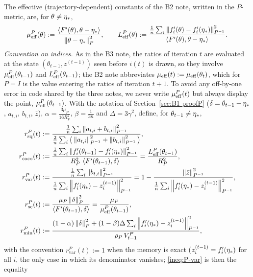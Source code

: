 \begin{definition}\label{def:B1-ratios}
The effective (trajectory-dependent) constants of the B2 note, written in the $P$-metric, are, for
$\theta\neq\eta_\ast$,
\begin{equation}\label{eq:B1-eff-constants}
\mu_{\mathrm{eff}}^P(\theta):=\frac{\left\langle F'(\theta), \theta-\eta_\ast \right\rangle}{\left\|\theta-\eta_\ast\right\|_P^2},
\qquad
L_{\mathrm{eff}}^P(\theta):=\frac{\frac1n\sum_i\left\|f'_i(\theta)-f'_i(\eta_\ast)\right\|_{P^{-1}}^2}
{\left\langle F'(\theta), \theta-\eta_\ast \right\rangle} .
\end{equation}
\emph{Convention on indices.} As in the B3 note, the ratios of iteration $t$ are evaluated at the state
$(\theta_{t-1},z^{(t-1)})$ seen before $i(t)$ is drawn, so they involve $\mu_{\mathrm{eff}}^P(\theta_{t-1})$ and
$L_{\mathrm{eff}}^P(\theta_{t-1})$; the B2 note abbreviates $\mu_{\mathrm{eff}}(t):=\mu_{\mathrm{eff}}(\theta_t)$, which for $P=I$ is the
value entering the ratios of iteration $t+1$. To avoid any off-by-one error in code shared by the three
notes, we never write $\mu_{\mathrm{eff}}^P(t)$ but always display the point, $\mu_{\mathrm{eff}}^P(\theta_{t-1})$.
With the notation of Section~\ref{sec:B1-proofP} ($\delta=\theta_{t-1}-\eta_\ast$, $a_{t,i}$, $b_{t,i}$,
$\bar z$), $\alpha=\frac{3\mu_P}{16R_P^2}$, $\beta=\frac1{3n}$ and $\Delta=3\gamma^2$, define, for
$\theta_{t-1}\neq\eta_\ast$,
\begin{align*}
r^P_{\mathrm{sq}}(t)&:=\frac{\frac1n\sum_i\left\|a_{t,i}+b_{t,i}\right\|_{P^{-1}}^2}
{\frac2n\sum_i\big(\left\|a_{t,i}\right\|_{P^{-1}}^2+\left\|b_{t,i}\right\|_{P^{-1}}^2\big)},\\
r^P_{\mathrm{coco}}(t)&:=\frac{\frac1n\sum_i\left\|f'_i(\theta_{t-1})-f'_i(\eta_\ast)\right\|_{P^{-1}}^2}
{R_P^2\,\left\langle F'(\theta_{t-1}), \delta \right\rangle}=\frac{L_{\mathrm{eff}}^P(\theta_{t-1})}{R_P^2},\\
r^P_{\mathrm{var}}(t)&:=\frac{\frac1n\sum_i\left\|b_{t,i}\right\|_{P^{-1}}^2}
{\frac1n\sum_i\left\|f'_i(\eta_\ast)-z_i^{(t-1)}\right\|_{P^{-1}}^2}
=1-\frac{\left\|\bar z\right\|_{P^{-1}}^2}{\frac1n\sum_i\left\|f'_i(\eta_\ast)-z_i^{(t-1)}\right\|_{P^{-1}}^2},\\
r^P_{\mathrm{sc}}(t)&:=\frac{\mu_P\left\|\delta\right\|_P^2}{\left\langle F'(\theta_{t-1}), \delta \right\rangle}
=\frac{\mu_P}{\mu_{\mathrm{eff}}^P(\theta_{t-1})},\\
r^P_{\mathrm{min}}(t)&:=\frac{(1-\alpha)\left\|\delta\right\|_P^2+(1-\beta)\Delta\sum_i\left\|f'_i(\eta_\ast)-z_i^{(t-1)}\right\|_{P^{-1}}^2}
{\rho_P\,V_{t-1}^P},
\end{align*}
with the convention $r^P_{\mathrm{var}}(t):=1$ when the memory is exact ($z_i^{(t-1)}=f'_i(\eta_\ast)$ for
all $i$, the only case in which its denominator vanishes; \eqref{ineq:P-var} is then the equality

\end{definition}
